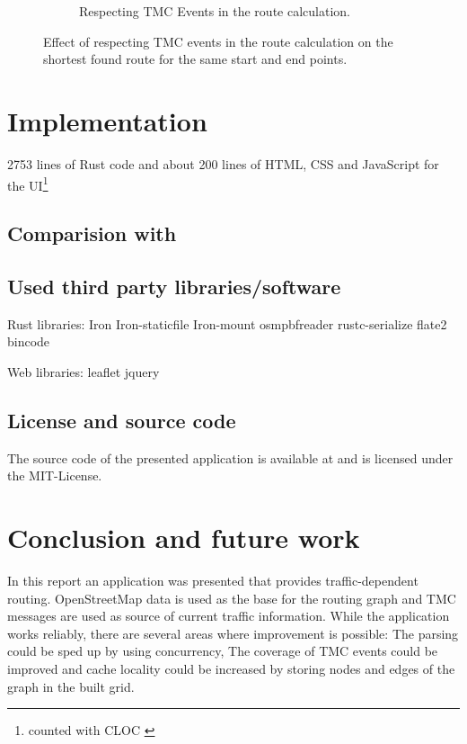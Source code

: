 \documentclass[a4paper]{scrartcl}
\begin{document}
\begin{figure}
\begin{subfigure}[b]{0.4\textwidth}
        \caption{Respecting TMC Events in the route calculation.}
        \label{fig:with_tmc}
    \end{subfigure}
    \caption{Effect of respecting TMC events in the route calculation on the shortest found route for the same start and end points.}\label{fig:tmc_comp}
\end{figure}

\section{Implementation}
\label{impl}

2753 lines of Rust code and about 200 lines of HTML, CSS and JavaScript for the UI\footnote{counted with CLOC \cite{cloc}}

\subsection{Comparision with }

\subsection{Used third party libraries/software}
Rust libraries:
Iron \cite{iron}
Iron-staticfile \cite{iron_staticfile}
Iron-mount \cite{iron_mount}
osmpbfreader \cite{osmpbfreader}
rustc-serialize \cite{rustc-serialize}
flate2 \cite{flate2}
bincode \cite{bincode}

Web libraries:
leaflet\cite{leaflet}
jquery \cite{jquery}

\subsection{License and source code}
The source code of the presented application is available at \cite{github} and is licensed under the MIT-License.

\section{Conclusion and future work}
\label{concl}
In this report an application was presented that provides traffic-dependent routing. OpenStreetMap data is used as the base for the routing graph and TMC messages are used as source of current traffic information. While the application works reliably, there are several areas where improvement is possible: The parsing could be sped up by using concurrency, The coverage of TMC events could be improved and cache locality could be increased by storing nodes and edges of the graph in the built grid. 
\end{document}
